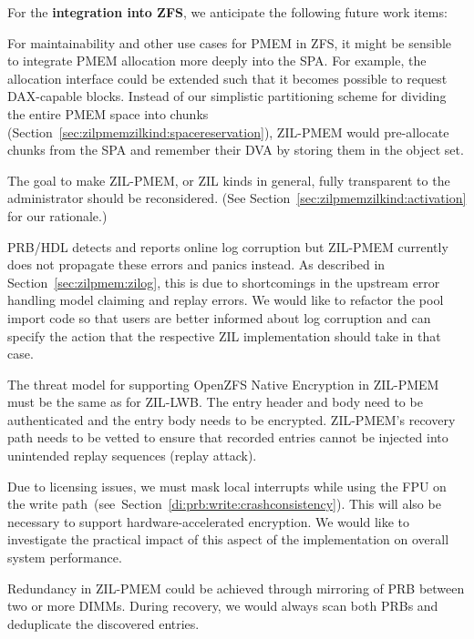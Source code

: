 \documentclass[12pt,a4paper,twoside]{book}
\begin{document}
For the \textbf{integration into ZFS}, we anticipate the following future work items:
\begin{description}[noitemsep,leftmargin=1.5cm,labelindent=1cm]
    \item[PMEM Space Management] For maintainability and other use cases for PMEM in ZFS, it might be sensible to integrate PMEM allocation more deeply into the SPA.
        For example, the allocation interface could be extended such that it becomes possible to request DAX-capable blocks.
        Instead of our simplistic partitioning scheme for dividing the entire PMEM space into chunks (Section~\ref{sec:zilpmemzilkind:spacereservation}), ZIL-PMEM would pre-allocate chunks from the SPA and remember their DVA by storing them in the object set.

    \item[ZIL Kinds User Experience] The goal to make ZIL-PMEM, or ZIL kinds in general, fully transparent to the administrator should be reconsidered.
        (See Section~\ref{sec:zilpmemzilkind:activation} for our rationale.)

    \item[Handling Of Claiming And Replay Errors] PRB/HDL detects and reports online log corruption but ZIL-PMEM currently does not propagate these errors and panics instead.
        As described in Section~\ref{sec:zilpmem:zilog}, this is due to shortcomings in the upstream error handling model claiming and replay errors.
        We would like to refactor the pool import code so that users are better informed about log corruption and can specify the action that the respective ZIL implementation should take in that case.

    \item[Support for Native Encryption] The threat model for supporting \mbox{OpenZFS} Native Encryption in ZIL-PMEM must be the same as for ZIL-LWB.
        The entry header and body need to be authenticated and the entry body needs to be encrypted.
        ZIL-PMEM's recovery path needs to be vetted to ensure that recorded entries cannot be injected into unintended replay sequences (replay attack).

    \item[System-Wide Impact Of Interrupt Masking] Due to licensing issues, we must mask local interrupts while using the FPU on the write path~(see~Section~\ref{di:prb:write:crashconsistency}).
        This will also be necessary to support hardware-accelerated encryption.
        We would like to investigate the practical impact of this aspect of the implementation on overall system performance.

    \item[Redundancy Through Mirroring] Redundancy in ZIL-PMEM could be achieved through mirroring of PRB between two or more DIMMs.
        During recovery, we would always scan both PRBs and deduplicate the discovered entries.
\end{description}
\end{document}
